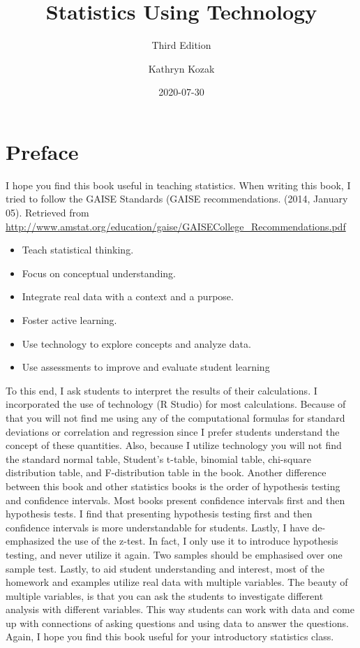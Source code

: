 \documentclass[
]{book}
\title{Statistics Using Technology}
\subtitle{Third Edition}
\author{Kathryn Kozak}
\date{2020-07-30}
\providecommand{\tightlist}{%
  \setlength{\itemsep}{0pt}\setlength{\parskip}{0pt}}
\begin{document}
\frontmatter
\maketitle

{
\setcounter{tocdepth}{1}
\tableofcontents
}
\mainmatter
\hypertarget{preface}{%
\chapter*{Preface}\label{preface}}

I hope you find this book useful in teaching statistics. When writing this book, I tried to follow the GAISE Standards (GAISE recommendations. (2014, January 05). Retrieved from \url{http://www.amstat.org/education/gaise/GAISECollege_Recommendations.pdf}

\begin{itemize}
\tightlist
\item
  Teach statistical thinking.
\item
  Focus on conceptual understanding.
\item
  Integrate real data with a context and a purpose.
\item
  Foster active learning.
\item
  Use technology to explore concepts and analyze data.
\item
  Use assessments to improve and evaluate student learning
\end{itemize}

To this end, I ask students to interpret the results of their calculations. I incorporated the use of technology (R Studio) for most calculations. Because of that you will not find me using any of the computational formulas for standard deviations or correlation and regression since I prefer students understand the concept of these quantities. Also, because I utilize technology you will not find the standard normal table, Student's t-table, binomial table, chi-square distribution table, and F-distribution table in the book. Another difference between this book and other statistics books is the order of hypothesis testing and confidence intervals. Most books present confidence intervals first and then hypothesis tests. I find that presenting hypothesis testing first and then confidence intervals is more understandable for students. Lastly, I have de-emphasized the use of the z-test. In fact, I only use it to introduce hypothesis testing, and never utilize it again. Two samples should be emphasised over one sample test. Lastly, to aid student understanding and interest, most of the homework and examples utilize real data with multiple variables. The beauty of multiple variables, is that you can ask the students to investigate different analysis with different variables. This way students can work with data and come up with connections of asking questions and using data to answer the questions. Again, I hope you find this book useful for your introductory statistics class.
\end{document}
